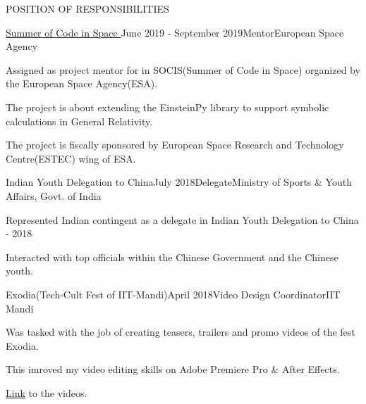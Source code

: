 \documentclass{resume} %
\begin{document}
\begin{rSection}{POSITION OF RESPONSIBILITIES}

\begin{rSubsection}{\href{https://socis.esa.int/projects}{Summer of Code in Space }}{June 2019 - September 2019}{Mentor}{European Space Agency}
\item Assigned as project mentor for in SOCIS(Summer of Code in Space) organized by the European Space Agency(ESA).
\item The project is about extending the EinsteinPy library to support symbolic calculations in General Relativity.
\item The project is fiscally sponsored by European Space Research and Technology Centre(ESTEC) wing of ESA.
\end{rSubsection}


\begin{rSubsection}{Indian Youth Delegation to China}{July 2018}{Delegate}{Ministry of Sports \& Youth Affairs, Govt. of India}
\item Represented Indian contingent as a delegate in Indian Youth Delegation to China - 2018
\item Interacted with top officials within the Chinese Government and the Chinese youth.
\end{rSubsection}


\begin{rSubsection}{Exodia(Tech-Cult Fest of IIT-Mandi)}{April 2018}{Video Design Coordinator}{IIT Mandi}
\item Was tasked with the job of creating teasers, trailers and promo videos of the fest Exodia.
\item This imroved my video editing skills on Adobe Premiere Pro \& After Effects.
\item \href{https://www.youtube.com/playlist?list=PLstTANwGhotvZNHDSR__iPnlhg73xYvq4}{Link} to the videos.
\end{rSubsection}

\end{rSection}
\end{document}
